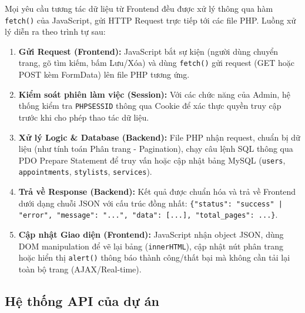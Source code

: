 \documentclass[../BTL.tex]{subfiles}
\begin{document}
Mọi yêu cầu tương tác dữ liệu từ Frontend đều được xử lý thông qua hàm \texttt{fetch()} của JavaScript, gửi HTTP Request trực tiếp tới các file PHP. Luồng xử lý diễn ra theo trình tự sau:

\begin{enumerate}
    \item \textbf{Gửi Request (Frontend):} JavaScript bắt sự kiện (người dùng chuyển trang, gõ tìm kiếm, bấm Lưu/Xóa) và dùng \texttt{fetch()} gửi request (GET hoặc POST kèm FormData) lên file PHP tương ứng.
    \item \textbf{Kiểm soát phiên làm việc (Session):} Với các chức năng của Admin, hệ thống kiểm tra \texttt{PHPSESSID} thông qua Cookie để xác thực quyền truy cập trước khi cho phép thao tác dữ liệu.
    \item \textbf{Xử lý Logic \& Database (Backend):} File PHP nhận request, chuẩn bị dữ liệu (như tính toán Phân trang - Pagination), chạy câu lệnh SQL thông qua PDO Prepare Statement để truy vấn hoặc cập nhật bảng MySQL (\texttt{users}, \texttt{appointments}, \texttt{stylists}, \texttt{services}).
    \item \textbf{Trả về Response (Backend):} Kết quả được chuẩn hóa và trả về Frontend dưới dạng chuỗi JSON với cấu trúc đồng nhất: \texttt{\{"status": "success" | "error", "message": "...", "data": [...], "total\_pages": ...\}}.
    \item \textbf{Cập nhật Giao diện (Frontend):} JavaScript nhận object JSON, dùng DOM manipulation để vẽ lại bảng (\texttt{innerHTML}), cập nhật nút phân trang hoặc hiển thị \texttt{alert()} thông báo thành công/thất bại mà không cần tải lại toàn bộ trang (AJAX/Real-time).
\end{enumerate}

\subsection{Hệ thống API của dự án}
\end{document}

